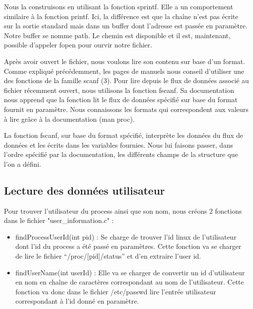 Nous la construisons en utilisant la fonction sprintf. Elle a un comportement similaire à la fonction printf. Ici, la différence est que la chaîne n'est pas écrite sur la sortie standard mais dans un buffer dont l'adresse est passée en paramètre. Notre buffer se nomme path. Le chemin est disponible et il est, maintenant, possible d'appeler fopen pour ourvir notre fichier.

Après avoir ouvert le fichier, nous voulons lire son contenu sur base d'un format. Comme expliqué précédemment, les pages de manuels nous conseil d'utiliser une des fonctions de la famille scanf (3). Pour lire depuis le flux de données associé au fichier récemment ouvert, nous utilisons la fonction fscanf. Sa documentation nous apprend que la fonction lit le flux de données spécifié sur base du format fournit en paramètre. Nous connaissons les formats qui correspondent aux valeurs à lire grâce à la documentation (man proc).

La fonction fscanf, sur base du format spécifié, interprète les données du flux de données et les écrits dans les variables fournies. Nous lui faisons passer, dans l'ordre spécifié par la documentation, les différents champs de la structure que l'on a défini.

\subsection{Lecture des données utilisateur}
Pour trouver l’utilisateur du process ainsi que son nom, nous créons 2 fonctions dans le fichier "user\_information.c" : 

\begin{itemize}
\item findProcessUserId(int pid) : Se charge de trouver l’id linux de l’utilisateur dont l’id du process a été passé en paramètres. Cette fonction va se charger de lire le fichier “/proc/[pid]/status” et d’en extraire l’user id.

\item findUserName(int userId) : Elle va se charger de convertir un id d’utilisateur en nom en chaîne de caractères correspondant au nom de l’utilisateur. Cette fonction va donc dans le fichier /etc/passwd lire l’entrée utilisateur correspondant à l’id donné en paramètre.
\end{itemize}